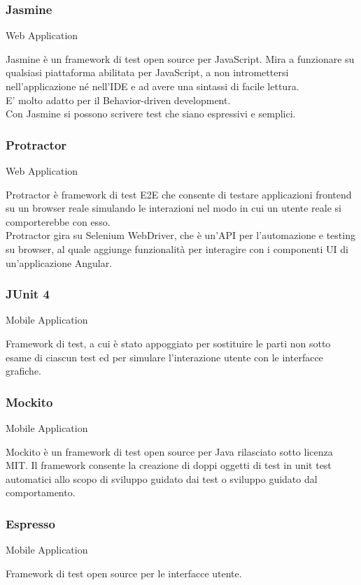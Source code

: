 \documentclass[../manuale-sviluppatore.tex]{subfiles}
\begin{document}
\subsubsection{Jasmine}%
\label{subs:jasmine}
Web Application

Jasmine è un framework di test open source per JavaScript. Mira a funzionare su qualsiasi piattaforma abilitata per JavaScript, a non intromettersi nell'applicazione né nell'IDE e ad avere una sintassi di facile lettura.\\
E' molto adatto per il Behavior-driven development.\\
Con Jasmine si possono scrivere test che siano espressivi e semplici.

\subsubsection{Protractor}%
\label{subs:protractor}
Web Application

Protractor è framework di test E2E che consente di testare applicazioni frontend su un browser reale simulando le interazioni nel modo in cui un utente reale si comporterebbe con esso.\\
Protractor gira su Selenium WebDriver, che è un’API per l’automazione e testing su browser, al quale aggiunge funzionalità per interagire con i componenti UI di un’applicazione Angular.

\subsubsection{JUnit 4}%
\label{subs:junit4}
Mobile Application

Framework di test, a cui è stato appoggiato  per sostituire le parti non sotto esame di ciascun test ed  per simulare l’interazione utente con le interfacce grafiche. 

\subsubsection{Mockito}%
\label{subs:mockito}
Mobile Application

Mockito è un framework di test open source per Java rilasciato sotto licenza MIT\@. 
Il framework consente la creazione di doppi oggetti di test in unit test automatici allo scopo di sviluppo guidato dai test o sviluppo guidato dal comportamento.

\subsubsection{Espresso}%
\label{subs:espresso}
Mobile Application

Framework di test open source per le interfacce utente.
\end{document}
